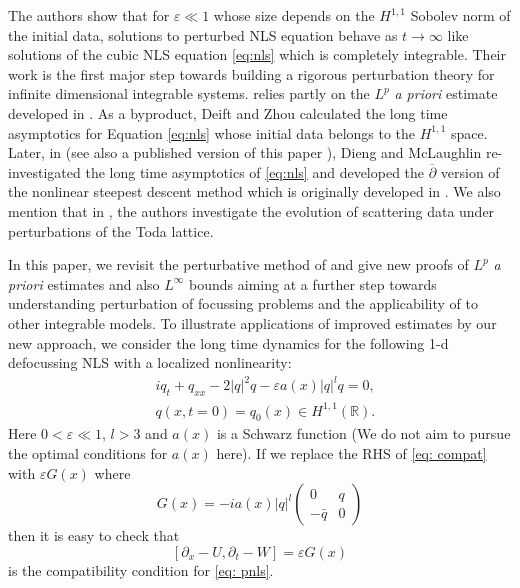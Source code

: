 \documentclass{amsart}
\theoremstyle{plain}
\theoremstyle{remark}
\numberwithin{equation}{section}
\newcommand{\eps}{\varepsilon}
\begin{document}
The authors show that for $\varepsilon\ll 1$ whose size depends on the $H^{1,1}$ Sobolev norm of the initial data, solutions to perturbed NLS equation behave as $t\to \infty$ like solutions of the cubic NLS equation \eqref{eq:nls} which is completely integrable. Their work is the first major step towards building a rigorous perturbation theory for infinite dimensional integrable systems. \cite{DZ-2} relies partly on the $L^p$ \textit{a priori} estimate developed in \cite{DZ-1}. As a byproduct, Deift and Zhou calculated the long time asymptotics for Equation \eqref{eq:nls} whose initial data belongs to the $H^{1,1}$ space. Later, in \cite{DMM18} (see also a published version of this paper \cite{DMM}), Dieng and McLaughlin re-investigated the long time asymptotics of \eqref{eq:nls} and developed the $\overline{\partial}$ version of the nonlinear steepest descent method which is originally developed in \cite{DZ93}. We also mention that in \cite{BI}, the authors investigate the evolution of scattering data under perturbations of the Toda lattice.



In this paper, we revisit the perturbative method of \cite{DZ-2} and  give  new  proofs of $L^p$  \emph{\textit{a priori}} estimates and also $L^\infty$ bounds aiming at a further step towards understanding perturbation of focussing problems and the applicability of \cite{DZ-2} to other
integrable models. To illustrate applications of improved estimates by our new approach, we consider the long time dynamics for the following 1-d defocussing NLS with a localized nonlinearity:
\begin{align}
\label{eq: pnls}
    &iq_t+q_{xx}-2|q|^2q-\eps a(x)|q|^l q=0,\\
    \nonumber
    & q(x, t=0)=q_0(x) \in H^{1,1}(\mathbb{R}).
\end{align}
Here $0<\varepsilon\ll 1$, $l>3$ and $a(x)$ is a Schwarz function (We do not aim to pursue the optimal conditions for 
 $a(x)$ here). 
If we replace the RHS of \eqref{eq: compat} with $\varepsilon G(x)$ where
\begin{equation}
\label{G}
  G(x) =-ia(x)|q|^l\left(\begin{array}{cc}
0 & q \\
-\bar{q} & 0
\end{array}\right) 
\end{equation}
then it is easy to check that 
\begin{equation}
    \label{eq: pcompat}
    \left[\partial_x-U, \partial_t-W\right]=\varepsilon G(x)
\end{equation}
is the compatibility condition for \eqref{eq: pnls}. 
\end{document}
